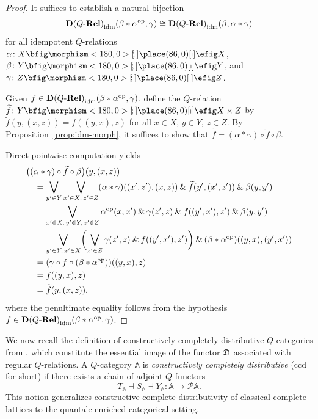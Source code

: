 \documentclass{tac}
\begin{document}
\begin{proof}
It suffices to establish a natural bijection
\[
{\mathbf{D}(Q\text{-}\mathbf{Rel})}_{\mathrm{idm}}(\beta*\alpha^{\mathrm{op}},\gamma)
\cong
{\mathbf{D}(Q\text{-}\mathbf{Rel})}_{\mathrm{idm}}(\beta,\alpha*\gamma)
\]
for all idempotent $Q$-relations $\alpha\colon X\nto X$, $\beta\colon Y\nto Y$, and $\gamma\colon Z\nto Z$.

Given $f\in{\mathbf{D}(Q\text{-}\mathbf{Rel})}_{\mathrm{idm}}(\beta*\alpha^{\mathrm{op}},\gamma)$, define the $Q$-relation $\widetilde{f}\colon Y\nto X\times Z$ by $\widetilde{f}(y,(x,z))=f((y,x),z)$ for all $x\in X$, $y\in Y$, $z\in Z$. By Proposition~\ref{prop:idm-morph}, it suffices to show that $\widetilde{f}=(\alpha*\gamma)\circ\widetilde{f}\circ\beta$.

Direct pointwise computation yields
\[
\begin{aligned}
&\bigl((\alpha*\gamma)\circ\widetilde{f}\circ\beta\bigr)(y,(x,z))\\
&\quad=\bigvee_{y'\in Y}\bigvee_{x'\in X,\,z'\in Z}
(\alpha*\gamma)((x',z'),(x,z))
\mathbin{\&}\widetilde{f}(y',(x',z'))\mathbin{\&}\beta(y,y')\\
&\quad=\bigvee_{x'\in X,\,y'\in Y,\,z'\in Z}
\alpha^{\mathrm{op}}(x,x')\mathbin{\&}\gamma(z',z)\mathbin{\&}f((y',x'),z')\mathbin{\&}\beta(y,y')\\
&\quad=\bigvee_{y'\in Y,\,x'\in X}
\biggl(\bigvee_{z'\in Z}\gamma(z',z)\mathbin{\&}f((y',x'),z')\biggr)
\mathbin{\&}(\beta*\alpha^{\mathrm{op}})((y,x),(y',x'))\\
&\quad=(\gamma\circ f\circ(\beta*\alpha^{\mathrm{op}}))((y,x),z)\\
&\quad=f((y,x),z)\\
&\quad=\widetilde{f}(y,(x,z)),
\end{aligned}
\]
where the penultimate equality follows from the hypothesis $f\in{\mathbf{D}(Q\text{-}\mathbf{Rel})}_{\mathrm{idm}}(\beta*\alpha^{\mathrm{op}},\gamma)$. 
\end{proof}

We now recall the definition of constructively completely distributive $Q$-categories from \cite{LaiShen2018,Stubbe2007b}, which constitute the essential image of the functor $\mathfrak{D}$ associated with regular $Q$-relations. A $Q$-category $\mathbb{A}$ is \emph{constructively completely distributive} (ccd for short) if there exists a chain of adjoint $Q$-functors
\[
T_{\mathbb{A}}\dashv S_{\mathbb{A}}\dashv Y_{\mathbb{A}}\colon
\mathbb{A}\to\mathcal{P}\mathbb{A}.
\]
This notion generalizes constructive complete distributivity of classical complete lattices \cite{Wood1990,KenneyWood2010,RosebrughWood1994} to the quantale-enriched categorical setting.
\end{document}

